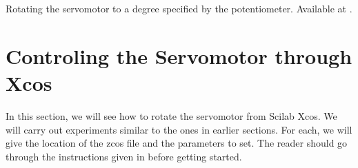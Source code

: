 \begin{scicode}
   {Rotating the servomotor to a degree specified by
    the potentiometer.  Available at .}
  \label{sci:servo-pot}
  
\end{scicode}


\section{Controling the Servomotor through Xcos}
\label{sec:servo-xcos}
In this section, we will see how to rotate the servomotor from Scilab
Xcos.  We will carry out experiments similar to the ones in earlier
sections.  For each, we will give the location of the zcos file and
the parameters to set.  The reader should go through the instructions
given in  before getting started.

